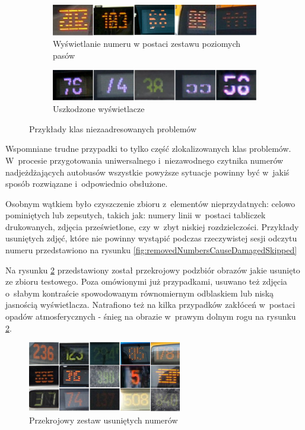 \begin{figure}[h!]
\begin{subfigure}{.60\linewidth}
	\end{subfigure}
	\hfill	
	\begin{subfigure}{.60\linewidth}\centering
		\centering
		\includegraphics[width=1\textwidth]{img/usunieteNumery/paski}
		\caption{Wyświetlanie numeru w postaci zestawu poziomych pasów}
	\end{subfigure}
	\hfill	
	\begin{subfigure}{.60\linewidth}\centering
		\centering
		\includegraphics[width=1\textwidth]{img/usunieteNumery/wady}
		\caption{Uszkodzone wyświetlacze}
	\end{subfigure}
	\caption{Przykłady klas niezaadresowanych problemów}
	\label{fig:removedNumbersCuseDistortion}
\end{figure}

Wspomniane trudne przypadki to tylko część zlokalizowanych klas 
problemów. W~procesie przygotowania uniwersalnego i~niezawodnego czytnika numerów
nadjeżdżających autobusów wszystkie powyższe sytuacje powinny być
w~jakiś sposób rozwiązane i~odpowiednio obsłużone.

Osobnym wątkiem było czyszczenie zbioru z~elementów nieprzydatnych:
celowo pominiętych lub zepsutych, takich jak: numery linii w~postaci tabliczek drukowanych, zdjęcia prześwietlone, czy w~zbyt niskiej rozdzielczości. 
Przykłady usuniętych zdjęć,
które nie powinny wystąpić podczas rzeczywistej sesji odczytu numeru przedstawiono
na rysunku \ref{fig:removedNumbersCauseDamagedSkipped}

Na rysunku \ref{fig:removeAllCross} przedstawiony 
został przekrojowy podzbiór obrazów jakie usunięto ze zbioru 
testowego. Poza omówionymi już przypadkami, usuwano też
zdjęcia o~słabym kontraście spowodowanym równomiernym odblaskiem lub 
niską jasnością wyświetlacza. Natrafiono też na kilka przypadków zakłóceń
w~postaci opadów atmosferycznych - śnieg na obrazie w~prawym dolnym rogu na 
rysunku \ref{fig:removeAllCross}.


\begin{figure}[!h]
	\centering
	\includegraphics[width=0.6\textwidth]{img/usunieteNumery/rozne}
	\caption{Przekrojowy zestaw usuniętych numerów}
	\label{fig:removeAllCross}
\end{figure}

